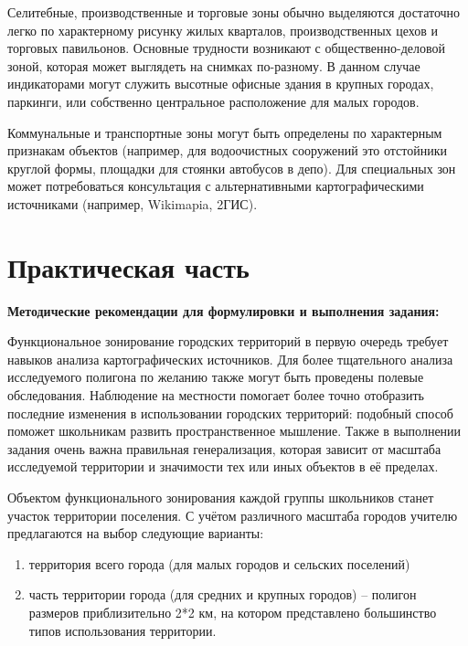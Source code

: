 \documentclass[
  11pt,
  russian,
]{book}
\begin{document}
Селитебные, производственные и торговые зоны
обычно выделяются достаточно легко по характерному рисунку жилых кварталов,
производственных цехов и торговых павильонов. Основные трудности возникают с
общественно-деловой зоной, которая может выглядеть на снимках по-разному. В
данном случае индикаторами могут служить высотные офисные здания в крупных
городах, паркинги, или собственно центральное расположение для малых городов.

Коммунальные и транспортные зоны могут быть
определены по характерным признакам объектов (например, для водоочистных
сооружений это отстойники круглой формы, площадки для стоянки автобусов в
депо). Для специальных зон может потребоваться консультация с альтернативными
картографическими источниками (например, Wikimapia, 2ГИС).

\hypertarget{ux43fux440ux430ux43aux442ux438ux447ux435ux441ux43aux430ux44f-ux447ux430ux441ux442ux44c-4}{%
\section{Практическая часть}\label{ux43fux440ux430ux43aux442ux438ux447ux435ux441ux43aux430ux44f-ux447ux430ux441ux442ux44c-4}}

\textbf{Методические рекомендации для формулировки и выполнения задания:}

Функциональное зонирование городских территорий
в первую очередь требует навыков анализа картографических источников. Для более тщательного анализа исследуемого полигона по желанию также могут быть проведены полевые обследования. Наблюдение на местности помогает более точно отобразить последние изменения в использовании городских территорий: подобный способ поможет школьникам развить пространственное мышление. Также в выполнении задания очень важна правильная генерализация, которая зависит от масштаба исследуемой территории и значимости тех или иных объектов в её пределах.

Объектом функционального зонирования каждой группы школьников станет участок территории поселения. С учётом различного масштаба городов учителю предлагаются на выбор следующие варианты:

\begin{enumerate}
\def\labelenumi{\arabic{enumi}.}
\item
  территория всего города (для малых городов и сельских поселений)
\item
  часть территории города (для средних и крупных городов) -- полигон размеров приблизительно 2*2 км, на котором
  представлено большинство типов использования территории.
\end{enumerate}
\end{document}
